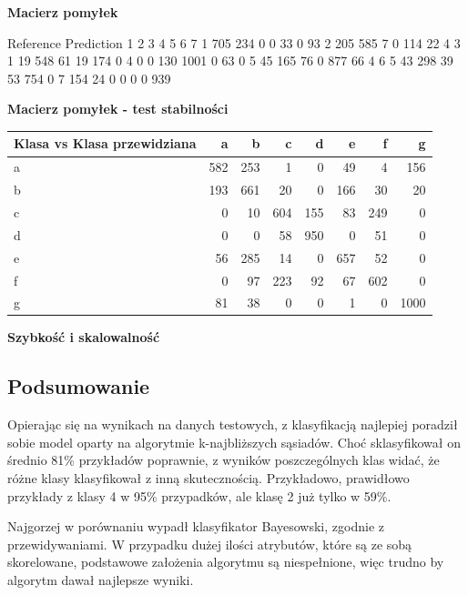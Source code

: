 \documentclass[11pt]{article} %
\begin{document}
\textbf{Macierz pomyłek}

          Reference
Prediction    1    2    3    4    5    6    7
         1  705  234    0    0   33    0   93
         2  205  585    7    0  114   22    4
         3    1   19  548   61   19  174    0
         4    0    0  130 1001    0   63    0
         5   45  165   76    0  877   66    4
         6    5   43  298   39   53  754    0
         7  154   24    0    0    0    0  939

\textbf{Macierz pomyłek - test stabilności}

\begin{center}
    \begin{tabular}{ | l | r | r | r | r | r | r | r | }
    \hline
 Klasa vs Klasa przewidziana &  a &  b &  c &  d &  e &  f &  g \\ \hline
a &  582 & 253 &  1 &  0 & 49 &  4 & 156 \\
b &  193 & 661 & 20 &  0 & 166 & 30 & 20 \\
c &   0 & 10 & 604 & 155 & 83 & 249 &  0 \\
d &  0  & 0 & 58 & 950 &  0 & 51 &  0\\
e & 56 & 285 & 14 &  0 & 657 &  52 &  0 \\
f &  0  & 97 &  223 & 92  & 67 & 602 &  0 \\
g & 81 & 38 &  0  & 0  & 1  & 0 & 1000 \\ \hline
    \end{tabular}
\end{center}
  
\textbf{Szybkość i skalowalność}

\subsection{Podsumowanie}

Opierając się na wynikach na danych testowych, z klasyfikacją najlepiej poradził sobie model oparty na algorytmie k-najbliższych sąsiadów. 
Choć sklasyfikował on średnio 81\% przykładów poprawnie, z wyników poszczególnych klas widać, że różne klasy klasyfikował z inną skutecznością. Przykładowo, prawidłowo przykłady z klasy 4 w 95\% przypadków, ale  klasę 2 już tylko w 59\%.

Najgorzej w porównaniu wypadł klasyfikator Bayesowski, zgodnie z przewidywaniami. W przypadku dużej ilości atrybutów, które są ze sobą skorelowane, podstawowe założenia algorytmu są niespełnione, więc trudno by algorytm dawał najlepsze wyniki.
\end{document}
